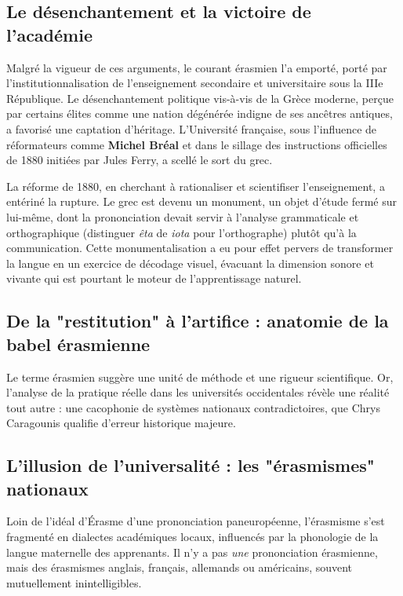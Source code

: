 \subsection{Le désenchantement et la victoire de l'académie}

Malgré la vigueur de ces arguments, le courant érasmien l'a emporté, porté par
l'institutionnalisation de l'enseignement secondaire et universitaire sous la IIIe République. Le
\og désenchantement\fg{} politique vis-à-vis de la Grèce moderne, perçue par certains élites comme
une nation \og dégénérée\fg{} indigne de ses ancêtres antiques, a favorisé une \og captation
d'héritage\fg{}.\cite{ref3} L'Université française, sous l'influence de réformateurs comme
\textbf{Michel Bréal} et dans le sillage des instructions officielles de 1880 initiées par Jules
Ferry, a scellé le sort du grec.\cite{ref3}

La réforme de 1880, en cherchant à rationaliser et \og scientifiser\fg{} l'enseignement, a entériné
la rupture. Le grec est devenu un \og monument\fg{}, un objet d'étude fermé sur lui-même, dont la
prononciation devait servir à l'analyse grammaticale et orthographique (distinguer \textit{êta} de
\textit{iota} pour l'orthographe) plutôt qu'à la communication. Cette \og monumentalisation\fg{} a
eu pour effet pervers de transformer la langue en un exercice de décodage visuel, évacuant la
dimension sonore et vivante qui est pourtant le moteur de l'apprentissage naturel.



\subsection{De la "restitution" à l'artifice : anatomie de la babel érasmienne}

Le terme \og érasmien\fg{} suggère une unité de méthode et une rigueur scientifique. Or, l'analyse
de la pratique réelle dans les universités occidentales révèle une réalité tout autre : une
cacophonie de systèmes nationaux contradictoires, que Chrys Caragounis qualifie d'erreur historique
majeure.



\subsection{L'illusion de l'universalité : les "érasmismes" nationaux}

Loin de l'idéal d'Érasme d'une prononciation paneuropéenne, l'érasmisme s'est fragmenté en dialectes
académiques locaux, influencés par la phonologie de la langue maternelle des apprenants. Il n'y a
pas \textit{une} prononciation érasmienne, mais des \og érasmismes\fg{} anglais, français, allemands
ou américains, souvent mutuellement inintelligibles.\cite{ref11}

